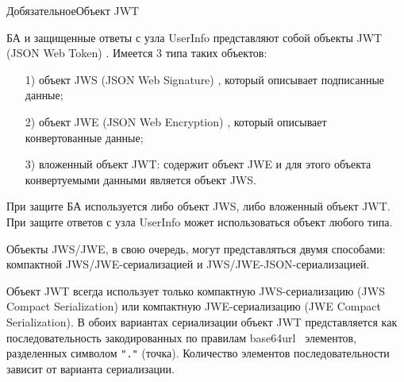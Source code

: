 \begin{appendix}{Д}{обязательное}{Объект JWT}\label{JWT}




БА и защищенные ответы с узла UserInfo представляют собой объекты 
JWT (JSON Web Token) \cite{RFC7519}. 
%
Имеется 3 типа таких объектов: 
\begin{itemize}
\item[1)] 
объект JWS (JSON Web Signature) \cite{RFC7515},
который описывает подписанные данные;
\item[2)] 
объект JWE (JSON Web Encryption) \cite{RFC7516},
который описывает конвертованные данные;
\item[3)] 
вложенный объект JWT: содержит объект JWE
и для этого объекта конвертуемыми данными является объект JWS.
\end{itemize}
При защите БА используется либо объект JWS, либо вложенный объект JWT.
При защите ответов с узла UserInfo может использоваться объект любого типа. 

Объекты JWS/JWE, в свою очередь, могут представляться двумя способами: 
компактной JWS/JWE-сериализацией и JWS/JWE-JSON-сериализацией.

Объект JWT всегда использует только компактную JWS-сериализацию (JWS 
Compact Serialization) или компактную JWE-сериализацию (JWE Compact 
Serialization). 
%
В обоих вариантах сериализации объект JWT представляется как последовательность 
закодированных по правилам base64url~\cite{RFC4648} элементов, разделенных 
символом \lstinline{"."} (точка). 
Количество элементов последовательности зависит от варианта сериализации.  


\end{appendix}
